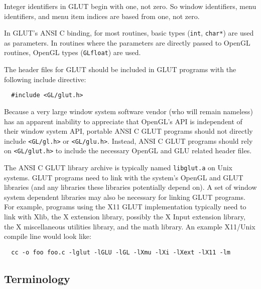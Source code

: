 \documentclass[titlepage,twoside]{article}
\begin{document}
Integer identifiers in GLUT begin with one, not zero.  So window identifiers,
menu identifiers, and menu item indices are based from one, not zero.

In GLUT's ANSI C binding, for most routines, basic types ({\tt int},
{\tt char*}) are used as parameters.  In routines where the parameters
are directly passed to OpenGL routines, OpenGL types ({\tt GLfloat})
are used.

The header files for GLUT should be included in GLUT programs
with the following include directive:
\begin{verbatim}
  #include <GL/glut.h>
\end{verbatim}
Because a very large window system software vendor (who will remain
nameless) has an apparent inability to appreciate that OpenGL's API is
independent of their window system API, portable ANSI C GLUT programs should
not directly include {\tt <GL/gl.h>} or {\tt <GL/glu.h>}.  Instead,
ANSI C GLUT programs should rely on {\tt <GL/glut.h>} to include the necessary
OpenGL and GLU related header files.

The ANSI C GLUT library archive is typically named {\tt libglut.a} on Unix
systems.  GLUT programs need to link with the system's OpenGL and GLUT libraries
(and any libraries these libraries potentially depend on).
A set of window system dependent libraries may also be necessary
for linking GLUT programs.  For example, programs using the X11 GLUT
implementation typically need to link with Xlib, the X extension
library, possibly the X Input extension library,  the X miscellaneous
utilities library, and the math library.  An example X11/Unix
compile line would look like:
\begin{verbatim}
  cc -o foo foo.c -lglut -lGLU -lGL -lXmu -lXi -lXext -lX11 -lm
\end{verbatim}

\subsection{Terminology}
\end{document}
